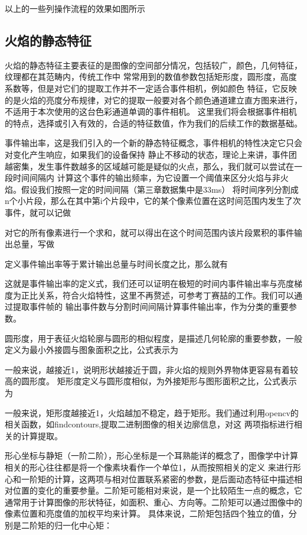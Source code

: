以上的一些列操作流程的效果如图所示

\subsection{火焰的静态特征}
火焰的静态特征主要表征的是图像的空间部分情况，包括较广，颜色，几何特征，纹理都在其范畴内，传统工作中
常常用到的数值参数包括矩形度，圆形度，高度系数等，但是对它们的提取工作并不一定适合事件相机，例如颜色
特征，它反映的是火焰的亮度分布规律，对它的提取一般要对各个颜色通道建立直方图来进行，不适用于本次使用的这台色彩通道单调的事件相机。
这里我们将会根据事件相机的特点，选择或引入有效的，合适的特征数值，作为我们的后续工作的数据基础。

事件输出率，这是我们引入的一个新的静态特征概念，事件相机的特性决定它只会对变化产生响应，如果我们的设备保持
静止不移动的状态，理论上来讲，事件团越密集，发生事件数越多的区域越可能是疑似的火点，那么，我们就可以尝试在一段时间间隔内
计算这个事件的输出频率，为它设置一个阈值来区分火焰与非火焰。假设我们按照一定的时间间隔（第三章数据集中是33ms）
将时间序列分割成n个小片段，那么在其中第i个片段中，它的某个像素位置在这时间范围内发生了次事件，就可以记做

对它的所有像素进行一个求和，就可以得出在这个时间范围内该片段累积的事件输出总量，写做

定义事件输出率等于累计输出总量与时间长度之比，那么就有

这就是事件输出率的定义式，我们还可以证明在极短的时间内事件输出率与亮度梯度为正比关系，符合火焰特性，这里不再赘述，可参考丁赛喆的工作\cite{ding2023}。我们可以通过提取事件帧的
输出事件数与分割时间间隔计算事件输出率，作为分类的重要参数。

圆形度，用于表征火焰轮廓与圆形的相似程度，是描述几何轮廓的重要参数，一般定义为最小外接圆与图象面积之比，公式表示为


一般来说，越接近1，说明形状越接近于圆，非火焰的规则外界物体更容易有着较高的圆形度。
矩形度定义与圆形度相似，为外接矩形与图形面积之比，公式表示为

一般来说，矩形度越接近1，火焰越加不稳定，趋于矩形。我们通过利用opencv的相关函数，如findcontours,提取二进制图像的相关边廓信息，对这
两项指标进行相关的计算提取。

形心坐标与静矩（一阶二阶），形心坐标是一个耳熟能详的概念了，图像学中计算相关的形心往往都是将一个像素块看作一个单位1，从而按照相关的定义
来进行形心和一阶矩的计算，这两项与相对位置联系紧密的参数，是后面动态特征中描述相对位置的变化的重要参量。二阶矩可能相对来说，是一个比较陌生一点的概念，它通常用于计算图像的形状特征，如面积、重心、方向等。二阶矩可以通过图像中的像素位置和亮度值的加权平均来计算。
具体来说，二阶矩包括四个独立的值，分别是二阶矩的归一化中心矩：

